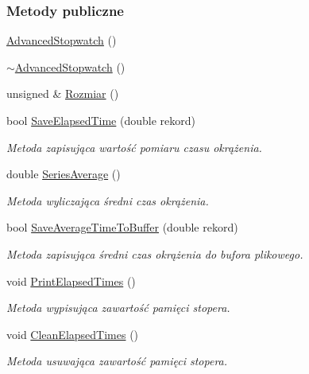 \subsubsection*{Metody publiczne}
\begin{DoxyCompactItemize}
\item 
\hyperlink{class_advanced_stopwatch_a2b43f9deab93398578e31205038d4f23}{Advanced\-Stopwatch} ()
\item 
\hyperlink{class_advanced_stopwatch_ab7f73fdeabf44c1557f27c6542099cd5}{$\sim$\-Advanced\-Stopwatch} ()
\item 
unsigned \& \hyperlink{class_advanced_stopwatch_ae4c7ec4341d3e7db1d75b704d1c75030}{Rozmiar} ()
\item 
bool \hyperlink{class_advanced_stopwatch_ad59c3b0557fc23c1cba33964259a6113}{Save\-Elapsed\-Time} (double rekord)
\begin{DoxyCompactList}\small\item\em Metoda zapisująca wartość pomiaru czasu okrążenia. \end{DoxyCompactList}\item 
double \hyperlink{class_advanced_stopwatch_a12a5049b736e3e394361f57221224b7e}{Series\-Average} ()
\begin{DoxyCompactList}\small\item\em Metoda wyliczająca średni czas okrążenia. \end{DoxyCompactList}\item 
bool \hyperlink{class_advanced_stopwatch_a559af3abdf7adbae5ef03f5d58b1b49c}{Save\-Average\-Time\-To\-Buffer} (double rekord)
\begin{DoxyCompactList}\small\item\em Metoda zapisująca średni czas okrążenia do bufora plikowego. \end{DoxyCompactList}\item 
void \hyperlink{class_advanced_stopwatch_ad05cc1b4240cd225ee92bec0d02cd6fd}{Print\-Elapsed\-Times} ()
\begin{DoxyCompactList}\small\item\em Metoda wypisująca zawartość pamięci stopera. \end{DoxyCompactList}\item 
void \hyperlink{class_advanced_stopwatch_a918c9a7a39e8984281e8dd531473183e}{Clean\-Elapsed\-Times} ()
\begin{DoxyCompactList}\small\item\em Metoda usuwająca zawartość pamięci stopera. \end{DoxyCompactList}\item 

\end{DoxyCompactItemize}
